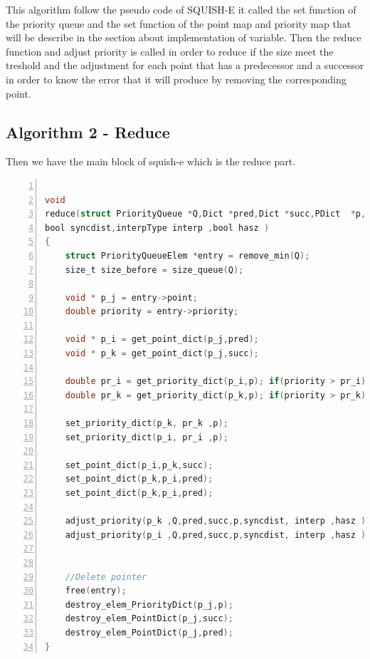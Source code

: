 \vspace{1cm}
This algorithm follow the pseudo code of SQUISH-E it called the set function of the priority queue and the set function of the point map and priority map that will be describe in the section about implementation of variable. Then the reduce function and adjust priority is called in order to reduce if the size meet the treshold and the adjustment for each point that has a predecessor and a successor in order to know the error that it will produce by removing the corresponding point.

\subsection{Algorithm 2 - Reduce}
Then we have the main block of squish-e which is the reduce part. 

\begin{minipage}{\linewidth}
\begin{lstlisting}[language=C, % Spécifie le langage du code
caption={reduce}, % Légende du listing
label=lst:reduce_c, % Étiquette pour référencer le listing
numbers=left,
numberstyle=\tiny\color{gray},
stepnumber=1,
frame=single,
breaklines=true,
postbreak=\mbox{\textcolor{red}{$\hookrightarrow$}\space},
showstringspaces=false
]

void
reduce(struct PriorityQueue *Q,Dict *pred,Dict *succ,PDict  *p,
bool syncdist,interpType interp ,bool hasz )
{
	struct PriorityQueueElem *entry = remove_min(Q);
	size_t size_before = size_queue(Q);
	
	void * p_j = entry->point;
	double priority = entry->priority;
	
	void * p_i = get_point_dict(p_j,pred);
	void * p_k = get_point_dict(p_j,succ);
	
	double pr_i = get_priority_dict(p_i,p); if(priority > pr_i){ pr_i = priority; }
	double pr_k = get_priority_dict(p_k,p); if(priority > pr_k){ pr_k = priority; }
	
	set_priority_dict(p_k, pr_k ,p);
	set_priority_dict(p_i, pr_i ,p);
	
	set_point_dict(p_i,p_k,succ);
	set_point_dict(p_k,p_i,pred);
	set_point_dict(p_k,p_i,pred);
	
	adjust_priority(p_k ,Q,pred,succ,p,syncdist, interp ,hasz );
	adjust_priority(p_i ,Q,pred,succ,p,syncdist, interp ,hasz );
	
	
	//Delete pointer
	free(entry);
	destroy_elem_PriorityDict(p_j,p);
	destroy_elem_PointDict(p_j,succ);
	destroy_elem_PointDict(p_j,pred);
}

\end{lstlisting}
\end{minipage}

